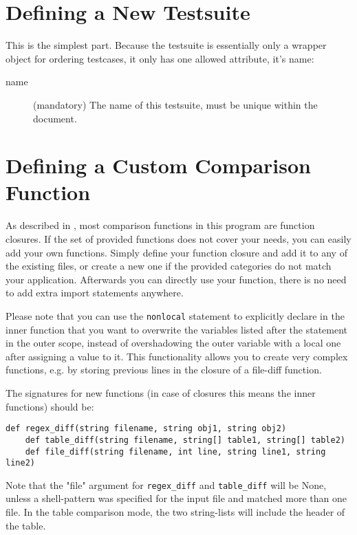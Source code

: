 \documentclass[a4paper,12pt]{scrartcl}
\begin{document}
\section{Defining a New Testsuite}
This is the simplest part. Because the testsuite is essentially only a wrapper object for ordering testcases, it only
has one allowed attribute, it's name:
\begin{description}
    \item[name] (mandatory) The name of this testsuite, must be unique within the document.
\end{description}

\section{Defining a Custom Comparison Function}
As described in , most comparison functions in this program are function closures. If the set of
provided functions does not cover your needs, you can easily add your own functions. Simply define your function
closure and add it to any of the existing files, or create a new one if the provided categories do not match your
application. Afterwards you can directly use your function, there is no need to add extra import statements anywhere.

Please note that you can use the \texttt{nonlocal} statement to explicitly declare in the inner function that you
want to overwrite the variables listed after the statement in the outer scope, instead of overshadowing the outer
variable with a local one after assigning a value to it. This functionality allows you to create very complex
functions, e.g. by storing previous lines in the closure of a file-diff function.

The signatures for new functions (in case of closures this means the inner functions) should be:
\begin{Verbatim}[commandchars=~\{\},gobble=4, frame=single, framesep=2mm, label=required signatures for comparison
functions, labelposition=bottomline]
    def regex_diff(string filename, string obj1, string obj2)
    def table_diff(string filename, string[] table1, string[] table2)
    def file_diff(string filename, int line, string line1, string line2)
\end{Verbatim}
Note that the "file" argument for \texttt{regex\_diff} and \texttt{table\_diff} will be None, unless a shell-pattern
was specified for the input file and matched more than one file. In the table comparison mode, the two string-lists
will include the header of the table.
\end{document}
